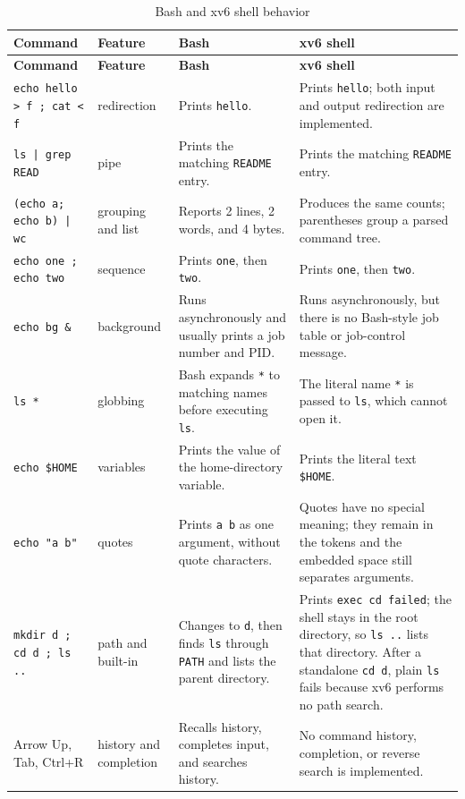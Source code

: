 \documentclass[12pt,a4paper]{article}
\begin{document}
\small
\begin{longtable}{|p{}|p{}|p{}|p{}|}
\caption{Bash and xv6 shell behavior}\label{tab:shell-comparison}\\
\hline
\textbf{Command} & \textbf{Feature} & \textbf{Bash} & \textbf{xv6 shell} \\
\hline
\endfirsthead
\hline
\textbf{Command} & \textbf{Feature} & \textbf{Bash} & \textbf{xv6 shell} \\
\hline
\endhead
\texttt{echo hello > f ; cat < f} & redirection & Prints \texttt{hello}. & Prints \texttt{hello}; both input and output redirection are implemented. \\
\hline
\texttt{ls | grep READ} & pipe & Prints the matching \texttt{README} entry. & Prints the matching \texttt{README} entry. \\
\hline
\texttt{(echo a; echo b) | wc} & grouping and list & Reports 2 lines, 2 words, and 4 bytes. & Produces the same counts; parentheses group a parsed command tree. \\
\hline
\texttt{echo one ; echo two} & sequence & Prints \texttt{one}, then \texttt{two}. & Prints \texttt{one}, then \texttt{two}. \\
\hline
\texttt{echo bg \&} & background & Runs asynchronously and usually prints a job number and PID. & Runs asynchronously, but there is no Bash-style job table or job-control message. \\
\hline
\texttt{ls *} & globbing & Bash expands \texttt{*} to matching names before executing \texttt{ls}. & The literal name \texttt{*} is passed to \texttt{ls}, which cannot open it. \\
\hline
\texttt{echo \$HOME} & variables & Prints the value of the home-directory variable. & Prints the literal text \texttt{\$HOME}. \\
\hline
\texttt{echo "a b"} & quotes & Prints \texttt{a b} as one argument, without quote characters. & Quotes have no special meaning; they remain in the tokens and the embedded space still separates arguments. \\
\texttt{mkdir d ; cd d ; ls ..} & path and built-in & Changes to \texttt{d}, then finds \texttt{ls} through \texttt{PATH} and lists the parent directory. & Prints \texttt{exec cd failed}; the shell stays in the root directory, so \texttt{ls ..} lists that directory. After a standalone \texttt{cd d}, plain \texttt{ls} fails because xv6 performs no path search. \\
\hline
Arrow Up, Tab, Ctrl+R & history and completion & Recalls history, completes input, and searches history. & No command history, completion, or reverse search is implemented. \\
\hline
\end{longtable}
\normalsize
\end{document}
